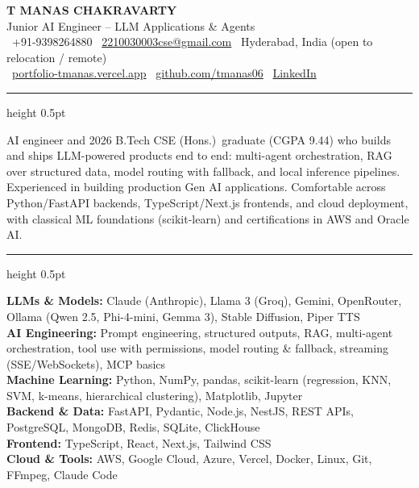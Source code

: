 \documentclass[11pt,a4paper]{article}
\newcommand{\cvsection}[1]{%
  \vspace{6pt}%
  \noindent{\large\textbf{\MakeUppercase{#1}}}%
  \vspace{2pt}%
  \hrule height 0.5pt%
  \vspace{4pt}%
}
\begin{document}
\begin{center}
  {\Huge \textbf{T MANAS CHAKRAVARTY}} \\[3pt]
  {\large Junior AI Engineer -- LLM Applications \& Agents} \\[5pt]
  \small
  \faPhone*\ +91-9398264880 \quad \textbar \quad
  \faEnvelope\ \href{mailto:2210030003cse@gmail.com}{2210030003cse@gmail.com} \quad \textbar \quad
  \faMapMarker*\ Hyderabad, India (open to relocation / remote) \\[3pt]
  \faGlobe\ \href{https://portfolio-tmanas.vercel.app}{portfolio-tmanas.vercel.app} \quad \textbar \quad
  \faGithub\ \href{https://github.com/tmanas06}{github.com/tmanas06} \quad \textbar \quad
  \faLinkedin\ \href{https://linkedin.com/in/t-manas-chakravarty-91958224b}{LinkedIn}
\end{center}

\cvsection{Summary}
\noindent AI engineer and 2026 B.Tech CSE (Hons.)\ graduate (CGPA 9.44) who builds and ships LLM-powered products end to end: multi-agent
orchestration, RAG over structured data, model routing with fallback, and local inference pipelines. Experienced in
building production Gen AI applications. Comfortable across Python/FastAPI backends, TypeScript/Next.js frontends, and cloud deployment, with
classical ML foundations (scikit-learn) and certifications in AWS and Oracle AI.

\cvsection{Technical Skills}
\noindent\textbf{LLMs \& Models:} Claude (Anthropic), Llama 3 (Groq), Gemini, OpenRouter, Ollama (Qwen 2.5, Phi-4-mini, Gemma 3), Stable Diffusion, Piper TTS \\
\textbf{AI Engineering:} Prompt engineering, structured outputs, RAG, multi-agent orchestration, tool use with permissions, model routing \& fallback, streaming (SSE/WebSockets), MCP basics \\
\textbf{Machine Learning:} Python, NumPy, pandas, scikit-learn (regression, KNN, SVM, k-means, hierarchical clustering), Matplotlib, Jupyter \\
\textbf{Backend \& Data:} FastAPI, Pydantic, Node.js, NestJS, REST APIs, PostgreSQL, MongoDB, Redis, SQLite, ClickHouse \\
\textbf{Frontend:} TypeScript, React, Next.js, Tailwind CSS \\
\textbf{Cloud \& Tools:} AWS, Google Cloud, Azure, Vercel, Docker, Linux, Git, FFmpeg, Claude Code
\end{document}
